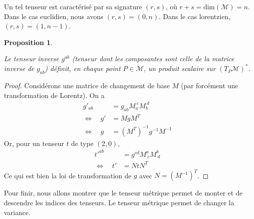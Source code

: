 \documentclass[a4paper,11pt]{report}
\theoremstyle{definition}
\theoremstyle{plain}
\newtheorem{prop}[thm]{Proposition}
\theoremstyle{definition}
\theoremstyle{remark}
\newcommand{\M}{\mathscr{M}}
\begin{document}
                Un tel tenseur est caractérisé par sa signature $(r,s)$, où $r+s = \text{dim}(\M) = n$. Dans le cas euclidien, nous avons $(r,s) = (0,n)$. Dans le cas lorentzien, $(r,s) = (1,n-1)$.
                
                \begin{prop}\begin{leftbar}
                    Le tenseur inverse $g^{ab}$ (tenseur dont les composantes sont celle de la matrice inverse de $g_{ab}$) définit, en chaque point $P\in\M$, un produit scalaire sur $(T_P\M)^*$.
                \end{leftbar}\end{prop}
                
                \begin{proof}
                    Considérons une matrice de changement de base $M$ (par forcément une transformation de Lorentz). On a
                    \begin{align}
                        g'_{ab} &= g_{ab}M_{a}^{~c}M_{b}^{~d}\\
                        \Leftrightarrow \quad g'&= MgM^T \\
                        \Leftrightarrow \quad g &= (M^T)^{-1}g^{-1}M^{-1}
                    \end{align}
                    Or, pour un tenseur $t$ de type $(2,0)$,
                    \begin{align}
                        t'^{ab} &= g^{cd}M^{a}_{~c}M^{b}_{~d}\\
                        \Leftrightarrow \quad t'&= NtN^T
                    \end{align}
                    Ce qui est bien la loi de transformation de $g$ avec $N = (M^{-1})^T$.
                \end{proof}
                
                Pour finir, nous allons montrer que le tenseur métrique permet de monter et de descendre les indices des tenseurs. Le tenseur métrique permet de changer la variance.\\
                
\end{document}
